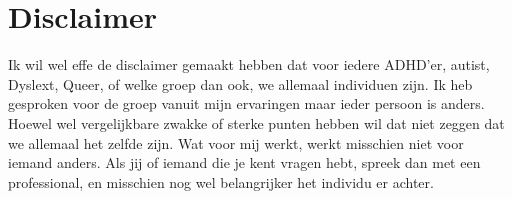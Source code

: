     \section{Disclaimer}
        Ik wil wel effe de disclaimer gemaakt hebben dat voor iedere ADHD'er, autist, Dyslext, Queer, of welke groep dan ook, we allemaal individuen zijn. Ik heb gesproken voor de groep vanuit mijn ervaringen maar ieder persoon is anders. Hoewel wel vergelijkbare zwakke of sterke punten hebben wil dat niet zeggen dat we allemaal het zelfde zijn. Wat voor mij werkt, werkt misschien niet voor iemand anders. Als jij of iemand die je kent vragen hebt, spreek dan met een professional, en misschien nog wel belangrijker het individu er achter.
        
    